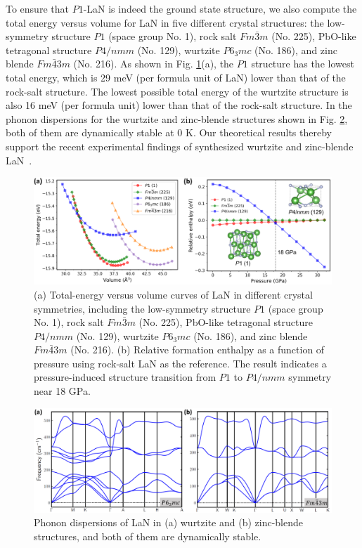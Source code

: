 	To ensure that $P1$-LaN is indeed the ground state structure, we also compute the total energy versus volume for LaN in five different crystal structures: the low-symmetry structure $P1$ (space group No. 1), rock salt $Fm\bar{3}m$ (No. 225), PbO-like tetragonal structure $P4/nmm$ (No. 129), wurtzite $P6_3mc$ (No. 186), and zinc blende $Fm\bar{4}3m$ (No. 216). As shown in Fig. \ref{fig:LaN_3}(a), the $P1$ structure has the lowest total energy, which is 29 meV (per formula unit of LaN) lower than that of the rock-salt structure. The lowest possible total energy of the wurtzite structure is also 16 meV (per formula unit) lower than that of the rock-salt structure. In the phonon dispersions for the wurtzite and zinc-blende structures shown in Fig. \ref{fig:LaN_4}, both of them are dynamically stable at 0 K. Our theoretical results thereby support the recent experimental findings of synthesized wurtzite and zinc-blende LaN~\cite{LaN_synthesis}.

	\begin{figure}
		\centering
        \captionsetup{singlelinecheck = false, justification=justified}
		\includegraphics[width=\linewidth]{LaN_3.png}
		\caption [Total energy and relative enthalpy of LaN in different structures.]{(a) Total-energy versus volume curves of LaN in different crystal symmetries, including the low-symmetry structure $P1$ (space group No. 1), rock salt $Fm\bar{3}m$ (No. 225), PbO-like tetragonal structure $P4/nmm$ (No. 129), wurtzite $P6_3mc$ (No. 186), and zinc blende $Fm\bar{4}3m$ (No. 216). (b) Relative formation enthalpy as a function of pressure using rock-salt LaN as the reference. The result indicates a pressure-induced structure transition from $P1$ to $P4/nmm$ symmetry near 18 GPa.}
		\label{fig:LaN_3}
	\end{figure}

	\begin{figure}
		\centering
        \captionsetup{singlelinecheck = false, justification=justified}
		\includegraphics[width=1.0\linewidth]{LaN_4.png}
		\caption[Phonon dispersions of LaN in wurtzite and zinc-blende structures]{Phonon dispersions of LaN in (a) wurtzite and (b) zinc-blende structures, and both of them are dynamically stable.}
		\label{fig:LaN_4}
	\end{figure}


